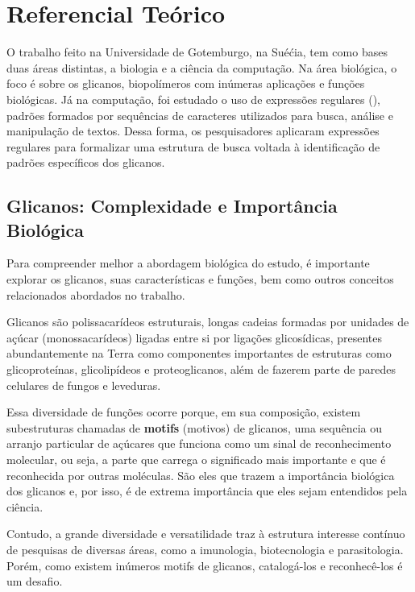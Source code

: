 \chapter{Referencial Teórico}

O trabalho feito na Universidade de Gotemburgo, na Suéćia, tem como bases duas
áreas distintas, a biologia e a ciência da computação. Na área biológica, o
foco é sobre os glicanos, biopolímeros com inúmeras aplicações e funções
biológicas. Já na computação, foi estudado o uso de expressões regulares
(), padrões formados por sequências de
caracteres utilizados para busca, análise e manipulação de textos. Dessa forma,
os pesquisadores aplicaram expressões regulares para formalizar uma estrutura
de busca voltada à identificação de padrões específicos dos glicanos.

\section{Glicanos: Complexidade e Importância Biológica}

Para compreender melhor a abordagem biológica do estudo, é importante explorar
os glicanos, suas características e funções, bem como outros conceitos
relacionados abordados no trabalho.

\begin{definition}[Glicanos]
  Glicanos são polissacarídeos estruturais, longas cadeias formadas por unidades
  de açúcar (monossacarídeos) ligadas entre si por ligações glicosídicas, presentes
  abundantemente na Terra como componentes importantes de estruturas como
  glicoproteínas, glicolipídeos e proteoglicanos, além de fazerem parte de
  paredes celulares de fungos e leveduras.
\end{definition}

Essa diversidade de funções ocorre porque, em sua composição, existem
subestruturas chamadas de \textbf{motifs} (motivos) de glicanos, uma sequência
ou arranjo particular de açúcares que funciona como um sinal de reconhecimento
molecular, ou seja, a parte que carrega o significado mais importante e que é
reconhecida por outras moléculas. São eles que trazem a importância biológica
dos glicanos e, por isso, é de extrema importância que eles sejam entendidos
pela ciência.

Contudo, a grande diversidade e versatilidade traz à estrutura interesse
contínuo de pesquisas de diversas áreas, como a imunologia, biotecnologia e
parasitologia. Porém, como existem inúmeros motifs de glicanos, catalogá-los e
reconhecê-los é um desafio.

